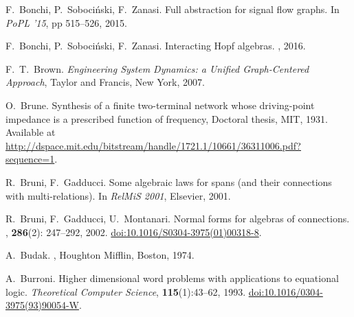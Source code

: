 \begin{thebibliography}{RSW00}
    F.\ Bonchi, P.\ Soboci\'nski, F.\ Zanasi.
    \newblock Full abstraction for signal flow graphs.
    \newblock In \emph{PoPL '15}, pp 515--526, 2015.

    F.\ Bonchi, P.\ Soboci\'nski, F.\ Zanasi.
    \newblock Interacting Hopf algebras.
    , 2016.



    F.\ T.\ Brown.
    \newblock \textsl{Engineering System Dynamics: a 
    Unified Graph-Centered Approach}, Taylor and Francis, New York, 2007. 

    O.\ Brune.
    \newblock Synthesis of a finite two-terminal network whose
    driving-point impedance is a prescribed function of frequency, Doctoral
    thesis, MIT, 1931.
    \newblock Available at
    \href{http://dspace.mit.edu/bitstream/handle/1721.1/10661/36311006.pdf?sequence=1}
    {http://dspace.mit.edu/bitstream/handle/1721.1/10661/36311006.pdf?sequence=1}.

    R.\ Bruni, F.\ Gadducci.
    \newblock Some algebraic laws for spans (and their
    connections with multi-relations).
    \newblock In \textsl{RelMiS 2001}, Elsevier, 2001.

    R.\ Bruni, F.\ Gadducci, U.\ Montanari.
    \newblock Normal forms for algebras of connections.
    , {\bf 286}(2): 247--292, 2002. 
    \newblock \href{http://dx.doi.org/10.1016/S0304-3975(01)00318-8}{doi:10.1016/S0304-3975(01)00318-8}.

    A.\ Budak.
    , Houghton Mifflin, Boston, 1974.

    A.\ Burroni.
    \newblock Higher dimensional word problems with
    applications to equational logic.
    \newblock \textsl{Theoretical Computer Science}, {\bf 115}(1):43--62, 1993.
    \newblock \href{http://dx.doi.org/10.1016/0304-3975(93)90054-W}{doi:10.1016/0304-3975(93)90054-W}.




\end{thebibliography}
